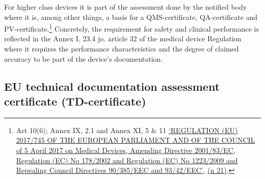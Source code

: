 \documentclass[
]{scrartcl}
\begin{document}
For higher class devices it is part of the assessment done by the notified body where it is, among other things, a basis for a QMS-certificate, QA-certificate and PV-certificate.\footnote{Art 10(6); Annex IX, 2.1 and Annex XI, 5 \& 11 \protect\hyperlink{ref-REGULATIONEU2017a}{{`{REGULATION} ({EU}) 2017/745 {OF THE EUROPEAN PARLIAMENT AND OF THE COUNCIL} of 5 {April} 2017 on Medical Devices, Amending {Directive} 2001/83/{EC}, {Regulation} ({EC}) {No} 178/2002 and {Regulation} ({EC}) {No} 1223/2009 and Repealing {Council Directives} 90/385/{EEC} and 93/42/{EEC}'}}, \protect\hyperlink{ref-REGULATIONEU2017a}{(n 21)}.} Concretely, the requirement for safety and clinical performance is reflected in the Annex I, 23.4 jo. article 32 of the medical device Regulation where it requires the performance characteristics and the degree of claimed accuracy to be part of the device's documentation.

\hypertarget{eu-technical-documentation-assessment-certificate-td-certificate}{%
\subsection{EU technical documentation assessment certificate (TD-certificate)}\label{eu-technical-documentation-assessment-certificate-td-certificate}}
\end{document}
